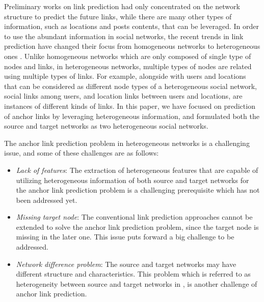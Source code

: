 \documentclass[conference]{IEEEtran}
\begin{document}
Preliminary works on link prediction had only concentrated on the network structure to predict the future links, while there are many other types of information, such as locations and posts contents, that can be leveraged. In order to use the abundant information in social networks, the recent trends in link prediction have changed their focus from homogeneous networks to heterogeneous ones \cite{davis2011, sun2011co, cao2014collective, zhang2013predicting}. Unlike homogeneous networks which are only composed of single type of nodes and links, in heterogeneous networks, multiple types of nodes are related using multiple types of links. For example, alongside with users and locations that can be considered as different node types of a heterogeneous social network, social links among users, and location links between users and locations, are instances of different kinds of links. In this paper, we have focused on prediction of anchor links by leveraging heterogeneous information, and formulated both the source and target networks as two heterogeneous social networks.

The anchor link prediction problem in heterogeneous networks is a challenging issue, and some of these challenges are as follows:

\begin{itemize}
\item \textit{Lack of features}:
The extraction of heterogeneous features that are capable of utilizing heterogeneous information of both source and target networks for the anchor link prediction problem is a challenging prerequisite which has not been addressed yet.

\item \textit{Missing target node}:
The conventional link prediction approaches cannot be extended to solve the anchor link prediction problem, since the target node is missing in the later one. This issue puts forward a big challenge to be addressed.

\item \textit{Network difference problem}:
The source and target networks may have different structure and characteristics. This problem which is referred to as heterogeneity between source and target networks in \cite{wu2014learning}, is another challenge of anchor link prediction.
\end{itemize}
\end{document}
